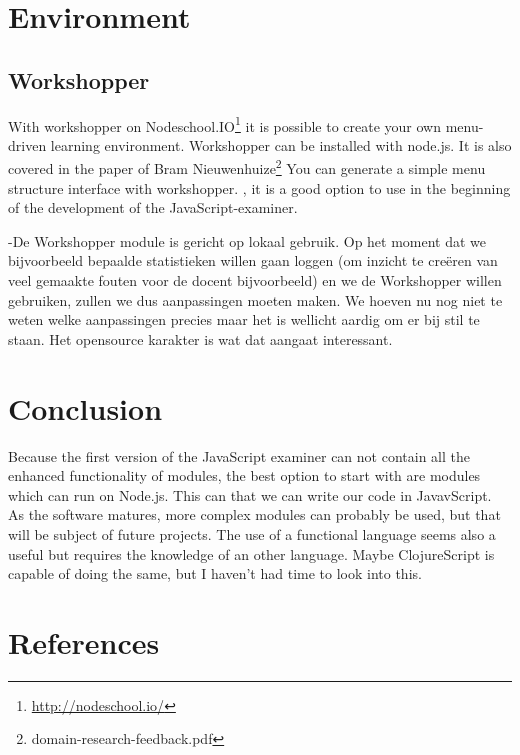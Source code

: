 \documentclass{article}
\begin{document}
\section{Environment}
\subsection{Workshopper}
With workshopper on Nodeschool.IO\footnote{\url{http://nodeschool.io/}} it is possible to create your own menu-driven learning environment. 
Workshopper can be installed with node.js.
It is also covered in the paper of Bram Nieuwenhuize\footnote{domain-research-feedback.pdf}
You can generate a simple menu structure interface with workshopper.
, it is a good option to use in 
the beginning of the development of the JavaScript-examiner.

-De Workshopper module is gericht op lokaal gebruik. Op het moment dat we bijvoorbeeld bepaalde statistieken willen gaan loggen (om inzicht te creëren van veel gemaakte fouten voor de docent bijvoorbeeld) en we de Workshopper willen gebruiken, zullen we dus aanpassingen moeten maken. We hoeven nu nog niet te weten welke aanpassingen precies maar het is wellicht aardig om er bij stil te staan. Het opensource karakter is wat dat aangaat interessant. 

\section{Conclusion}
Because the first version of the JavaScript examiner can not contain all the enhanced 
functionality of modules, the best option to start with are modules which can run on Node.js.
This can that we can write our code in JavavScript.
As the software matures, more complex modules can probably be used, but that will be subject of future projects.
The use of a functional language seems also a useful but requires the knowledge of an other language.
Maybe ClojureScript is capable of doing the same, but I haven't had time to look into this.  

\section{References}
\end{document}
